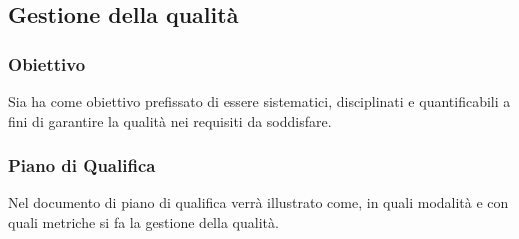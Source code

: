 
\subsection{Gestione della qualità}
\subsubsection{Obiettivo}
Sia ha come obiettivo prefissato di essere sistematici, disciplinati e quantificabili a fini di garantire la qualità nei requisiti da soddisfare.

\subsubsection{Piano di Qualifica}
Nel documento di piano di qualifica verrà illustrato come, in quali modalità e con quali metriche si fa la gestione della qualità.